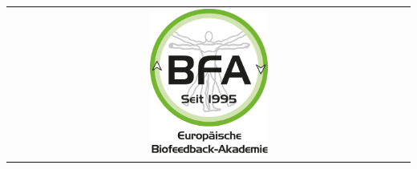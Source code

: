 \begin{center}
\begin{tabular}{ c c }
        \multicolumn{2}{c}{\includegraphics[width=0.3\textwidth]{tex/images/sponsors/BFA.png}}     
    \end{tabular}
    \end{center}

\vfill

\newpage
